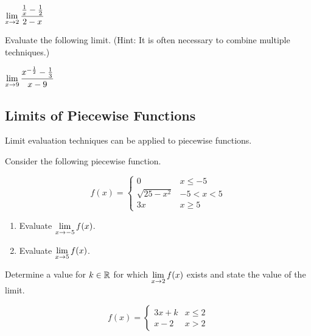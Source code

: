\documentclass[12pt]{article}
\begin{document}
\vspace{5mm}

\hspace{10mm} $\displaystyle\lim_{x\to 2}\frac{\frac{1}{x}-\frac{1}{2}}{2-x}$

\vspace{45mm}

\Example Evaluate the following limit. (Hint: It is often necessary to combine multiple techniques.)

\vspace{5mm}

\hspace{10mm} $\displaystyle\lim_{x\to 9}\frac{x^{-\frac{1}{2}}-\frac{1}{3}}{x-9}$

\vspace{45mm}

\newpage

\subsection*{Limits of Piecewise Functions} 

Limit evaluation techniques can be applied to piecewise functions.

\Example Consider the following piecewise function.

$$ f(x) = \begin{cases} 0 & x \leqslant -5 \\ \sqrt{25-x^2} & -5 < x < 5 \\ 3x & x \geqslant 5 \end{cases} $$

\begin{enumerate}
\item[\tc{1}] Evaluate $\displaystyle\lim_{x\to -5}f(x)$.

\vspace{40mm}

\item[\tc{2}] Evaluate $\displaystyle\lim_{x\to 5}f(x)$.

\vspace{40mm}

\end{enumerate}


\Example Determine a value for $k\in\mathbb{R}$ for which $\displaystyle\lim_{x\to 2}f(x)$ exists and state the value of the limit.

$$ f(x) = \begin{cases} 3x + k & x \leqslant 2 \\ x - 2 & x > 2 \end{cases} $$
\end{document}

